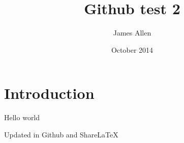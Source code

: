 \documentclass{article}
\title{Github test 2}
\author{James Allen}
\date{October 2014}
\begin{document}
\maketitle

\section{Introduction}

Hello world

Updated in Github and ShareLaTeX
\end{document}
